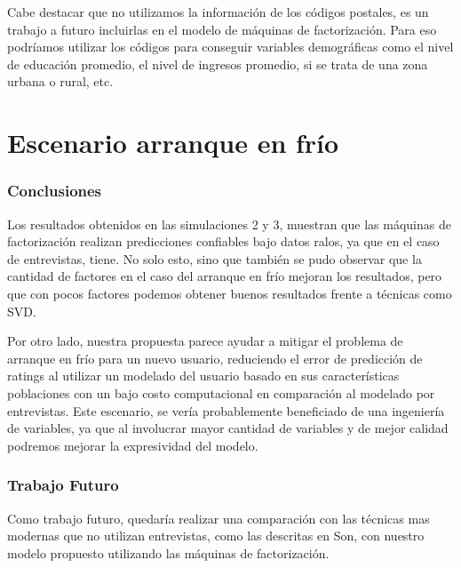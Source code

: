 \documentclass[hidelinks,12pt,a4paper]{book}
\theoremstyle{plain}
\theoremstyle{definition}
\begin{document}
Cabe destacar que no utilizamos la información de los códigos postales, es un trabajo a futuro incluirlas en el modelo de máquinas de factorización. Para eso podríamos utilizar los códigos para conseguir variables demográficas como el nivel de educación promedio, el nivel de ingresos promedio, si se trata de una zona urbana o rural, etc.

\section{Escenario arranque en frío}

\subsubsection{Conclusiones}

Los resultados obtenidos en las simulaciones 2 y 3, muestran que las máquinas de factorización realizan predicciones confiables bajo datos ralos, ya que en el caso de entrevistas, tiene. No solo esto, sino que también se pudo observar que la cantidad de factores en el caso del arranque en frío mejoran los resultados, pero que con pocos factores podemos obtener buenos resultados frente a técnicas como SVD.

Por otro lado, nuestra propuesta parece ayudar a mitigar el problema de arranque en frío para un nuevo usuario, reduciendo el error de predicción de ratings al utilizar un modelado del usuario basado en sus características poblaciones con un bajo costo computacional en comparación al modelado por entrevistas. Este escenario, se vería probablemente beneficiado de una ingeniería de variables, ya que al involucrar mayor cantidad de variables y de mejor calidad podremos mejorar la expresividad del modelo.

\subsubsection{Trabajo Futuro}

Como trabajo futuro, quedaría realizar una comparación con las técnicas mas modernas que no utilizan entrevistas, como las descritas en Son\cite{CS:New-son2016dealing}, con nuestro modelo propuesto utilizando las máquinas de factorización.







\end{document}
